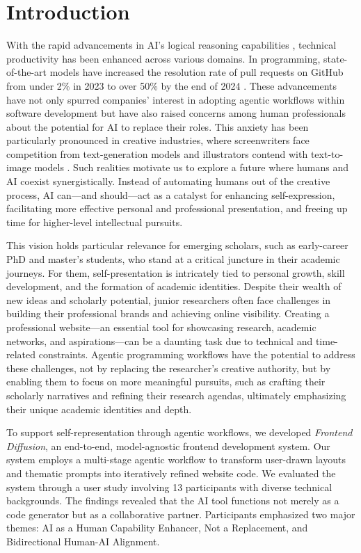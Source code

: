 \section{Introduction}
\label{sec:intro}

With the rapid advancements in AI's logical reasoning capabilities \cite{guo2025deepseek,openaiOpenAIO3mini2025}, technical productivity has been enhanced across various domains. In programming, state-of-the-art models have increased the resolution rate of pull requests on GitHub from under 2\% in 2023 to over 50\% by the end of 2024 \cite{jimenez2024swebench}. These advancements have not only spurred companies' interest in adopting agentic workflows within software development but have also raised concerns among human professionals about the potential for AI to replace their roles. This anxiety has been particularly pronounced in creative industries, where screenwriters face competition from text-generation models \cite{mirowskiCoWritingScreenplaysTheatre2023} and illustrators contend with text-to-image models \cite{koLargescaleTexttoImageGeneration2023,jiangAIArtIts2023,kawakamiImpactGenerativeAI2024}. Such realities motivate us to explore a future where humans and AI coexist synergistically. Instead of automating humans out of the creative process, AI can—and should—act as a catalyst for enhancing self-expression, facilitating more effective personal and professional presentation, and freeing up time for higher-level intellectual pursuits.

This vision holds particular relevance for emerging scholars, such as early-career PhD and master's students, who stand at a critical juncture in their academic journeys. For them, self-presentation is intricately tied to personal growth, skill development, and the formation of academic identities. Despite their wealth of new ideas and scholarly potential, junior researchers often face challenges in building their professional brands and achieving online visibility. Creating a professional website—an essential tool for showcasing research, academic networks, and aspirations—can be a daunting task due to technical and time-related constraints. Agentic programming workflows have the potential to address these challenges, not by replacing the researcher's creative authority, but by enabling them to focus on more meaningful pursuits, such as crafting their scholarly narratives and refining their research agendas, ultimately emphasizing their unique academic identities and depth.

To support self-representation through agentic workflows, we developed \textit{Frontend Diffusion}, an end-to-end, model-agnostic frontend development system. Our system employs a multi-stage agentic workflow to transform user-drawn layouts and thematic prompts into iteratively refined website code. We evaluated the system through a user study involving 13 participants with diverse technical backgrounds. The findings revealed that the AI tool functions not merely as a code generator but as a collaborative partner. Participants emphasized two major themes: AI as a Human Capability Enhancer, Not a Replacement, and Bidirectional Human-AI Alignment.

